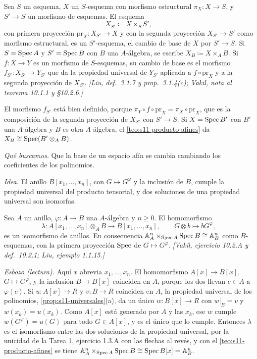 \begin{defi}
\label{defi:s11-cambio-base}
Sea \(S\) un esquema, \(X\) un \(S\)-esquema con morfismo estructural \(\pi_X\colon X\to S\), y \(S'\to S\) un morfismo de esquemas. El esquema
\[
 X_{S'}\coloneqq X\times_S S',
\]
con primera proyección \(\mathrm{pr}_X\colon X_{S'}\to X\) y con la segunda proyección \(X_{S'}\to S'\) como morfismo estructural, es un \(S'\)-esquema, el cambio de base de \(X\) por \(S'\to S\). Si \(S=\operatorname{Spec} A\) y \(S'=\operatorname{Spec} B\) con \(B\) una \(A\)-álgebra, se escribe \(X_B\coloneqq X\times_A B\). Si \(f\colon X\to Y\) es un morfismo de \(S\)-esquemas, su cambio de base es el morfismo \(f_{S'}\colon X_{S'}\to Y_{S'}\) que da la propiedad universal de \(Y_{S'}\) aplicada a \(f\circ\mathrm{pr}_X\) y a la segunda proyección de \(X_{S'}\). \emph{[Liu, def.~3.1.7 y prop.~3.1.4(c); Vakil, nota al teorema 10.1.1 y \S10.2.6.]}
\end{defi}

El morfismo \(f_{S'}\) está bien definido, porque \(\pi_Y\circ f\circ\mathrm{pr}_X=\pi_X\circ\mathrm{pr}_X\), que es la composición de la segunda proyección de \(X_{S'}\) con \(S'\to S\). Si \(X=\operatorname{Spec} B'\) con \(B'\) una \(A\)-álgebra y \(B\) es otra \(A\)-álgebra, el \cref{teo:s11-producto-afines} da \(X_B\cong\operatorname{Spec}(B'\otimes_A B)\).

\emph{Qué buscamos.} Que la base de un espacio afín se cambia cambiando los coeficientes de los polinomios.

\emph{Idea.} El anillo \(B[x_1,\ldots,x_n]\), con \(G\mapsto G^\varphi\) y la inclusión de \(B\), cumple la propiedad universal del producto tensorial, y dos soluciones de una propiedad universal son isomorfas.

\begin{lema}
\label{lema:s11-polinomios-tensorial}
Sea \(A\) un anillo, \(\varphi\colon A\to B\) una \(A\)-álgebra y \(n\ge0\). El homomorfismo
\[
 \lambda\colon A[x_1,\ldots,x_n]\otimes_A B\longrightarrow B[x_1,\ldots,x_n],
 \qquad G\otimes b\longmapsto bG^\varphi,
\]
es un isomorfismo de anillos. En consecuencia \(\mathbb A_A^n\times_{\operatorname{Spec} A}\operatorname{Spec} B\cong\mathbb A_B^n\) como \(B\)-esquemas, con la primera proyección \(\operatorname{Spec}\) de \(G\mapsto G^\varphi\). \emph{[Vakil, ejercicio 10.2.A y def.~10.2.1; Liu, ejemplo 1.1.15.]}
\end{lema}

\emph{Esbozo (lectura).} Aquí \(x\) abrevia \(x_1,\ldots,x_n\). El homomorfismo \(A[x]\to B[x]\), \(G\mapsto G^\varphi\), y la inclusión \(B\to B[x]\) coinciden en \(A\), porque los dos llevan \(c\in A\) a \(\varphi(c)\). Si \(u\colon A[x]\to R\) y \(v\colon B\to R\) coinciden en \(A\), la propiedad universal de los polinomios, \cref{prop:s11-universales}(a), da un único \(w\colon B[x]\to R\) con \(w|_B=v\) y \(w(x_k)=u(x_k)\). Como \(A[x]\) está generado por \(A\) y las \(x_k\), ese \(w\) cumple \(w(G^\varphi)=u(G)\) para todo \(G\in A[x]\), y es el único que lo cumple. Entonces \(\lambda\) es el isomorfismo entre las dos soluciones de la propiedad universal, por la unicidad de la Tarea 1, ejercicio 1.3.A con las flechas al revés, y con el \cref{teo:s11-producto-afines} se tiene \(\mathbb A_A^n\times_{\operatorname{Spec} A}\operatorname{Spec} B\cong\operatorname{Spec} B[x]=\mathbb A_B^n\).

